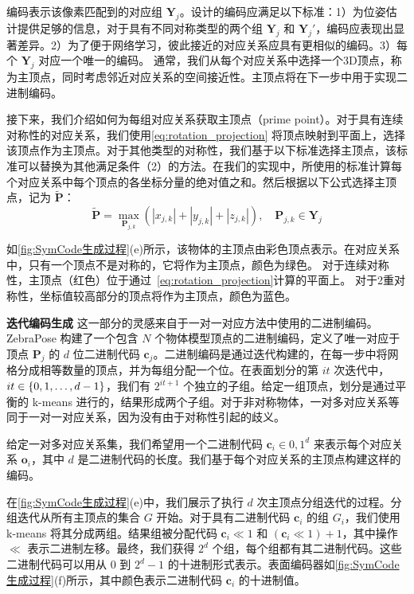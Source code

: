 编码表示该像素匹配到的对应组 $\mathbf{Y}_j$。设计的编码应满足以下标准：1）为位姿估计提供足够的信息，对于具有不同对称类型的两个组 $\mathbf{Y}_j$ 和 $\mathbf{Y}_j'$，编码应表现出显著差异。2）为了便于网络学习，彼此接近的对应关系应具有更相似的编码。3）每个 $\mathbf{Y}_j$ 对应一个唯一的编码。
通常，我们从每个对应关系中选择一个3D顶点，称为主顶点，同时考虑邻近对应关系的空间接近性。主顶点将在下一步中用于实现二进制编码。

接下来，我们介绍如何为每组对应关系获取主顶点（prime point）。对于具有连续对称性的对应关系，我们使用\autoref{eq:rotation_projection} 将顶点映射到平面上，选择该顶点作为主顶点。对于其他类型的对称性，我们基于以下标准选择主顶点，该标准可以替换为其他满足条件（2）的方法。在我们的实现中，所使用的标准计算每个对应关系中每个顶点的各坐标分量的绝对值之和。然后根据以下公式选择主顶点，记为 $\tilde{\mathbf{P}}$：
\begin{equation}
    \tilde{\mathbf{P}} = \max_{\mathbf{P}_{j,k}}
    (\left | x_{j,k} \right | +\left | y_{j,k} \right | +\left | z_{j,k} \right |), \quad \mathbf{P}_{j,k} \in \mathbf{Y}_j
\end{equation}

如\autoref{fig:SymCode生成过程}(e)所示，该物体的主顶点由彩色顶点表示。在对应关系中，只有一个顶点不是对称的，它将作为主顶点，颜色为绿色。
对于连续对称性，主顶点（红色）位于通过~\autoref{eq:rotation_projection}计算的平面上。
对于2重对称性，坐标值较高部分的顶点将作为主顶点，颜色为蓝色。

\textbf{迭代编码生成 } 这一部分的灵感来自于一对一对应方法中使用的二进制编码\cite{su2022zebrapose}。ZebraPose\cite{su2022zebrapose} 构建了一个包含 $N$ 个物体模型顶点的二进制编码，定义了唯一对应于顶点 $\mathbf{P}_j$ 的 $d$ 位二进制代码 $\mathbf{c}_{j}$。二进制编码是通过迭代构建的，在每一步中将网格分成相等数量的顶点，并为每组分配一个位。在表面划分的第 $it$ 次迭代中，$it \in \{0, 1, \text{\textellipsis}, d-1\}$，我们有 $2^{it+1}$ 个独立的子组。给定一组顶点，划分是通过平衡的 k-means 进行的，结果形成两个子组。对于非对称物体，一对多对应关系等同于一对一对应关系，因为没有由于对称性引起的歧义。

给定一对多对应关系集，我们希望用一个二进制代码 $\mathbf{c}_i \in {0, 1}^d$ 来表示每个对应关系 $\mathbf{o}_i$，其中 $d$ 是二进制代码的长度。我们基于每个对应关系的主顶点构建这样的编码。

在\autoref{fig:SymCode生成过程}(e)中，我们展示了执行 $d$ 次主顶点分组迭代的过程。分组迭代从所有主顶点的集合 $G$ 开始。对于具有二进制代码 $\mathbf{c}_i$ 的组 $G_{i}$，我们使用 k-means 将其分成两组。结果组被分配代码 $\mathbf{c}_i \ll 1$ 和 $(\mathbf{c}_i \ll 1) + 1$，其中操作 $\ll$ 表示二进制左移。最终，我们获得 $2^d$ 个组，每个组都有其二进制代码。这些二进制代码可以用从 $0$ 到 $2^d - 1$ 的十进制形式表示。表面编码器如\autoref{fig:SymCode生成过程}(f)所示，其中颜色表示二进制代码 $\mathbf{c}_i$ 的十进制值。

